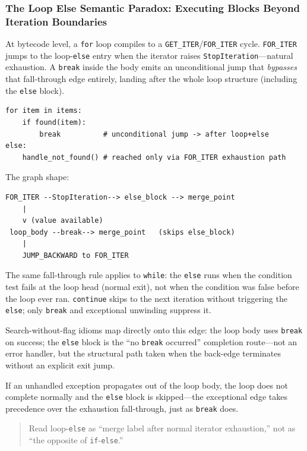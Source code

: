 \documentclass[a4paper,twoside]{report}
\begin{document}
\subsubsection{The Loop Else Semantic Paradox: Executing Blocks Beyond Iteration Boundaries}

At bytecode level, a \texttt{for} loop compiles to a \texttt{GET\_ITER}/\texttt{FOR\_ITER} cycle. \texttt{FOR\_ITER} jumps to the loop-\texttt{else} entry when the iterator raises \texttt{StopIteration}---natural exhaustion. A \texttt{break} inside the body emits an unconditional jump that \emph{bypasses} that fall-through edge entirely, landing after the whole loop structure (including the \texttt{else} block).

\begin{verbatim}
for item in items:
    if found(item):
        break          # unconditional jump -> after loop+else
else:
    handle_not_found() # reached only via FOR_ITER exhaustion path
\end{verbatim}

The graph shape:

\begin{verbatim}
FOR_ITER --StopIteration--> else_block --> merge_point
    |
    v (value available)
 loop_body --break--> merge_point   (skips else_block)
    |
    JUMP_BACKWARD to FOR_ITER
\end{verbatim}

The same fall-through rule applies to \texttt{while}: the \texttt{else} runs when the condition test fails at the loop head (normal exit), not when the condition was false before the loop ever ran. \texttt{continue} skips to the next iteration without triggering the \texttt{else}; only \texttt{break} and exceptional unwinding suppress it.

Search-without-flag idioms map directly onto this edge: the loop body uses \texttt{break} on success; the \texttt{else} block is the ``no \texttt{break} occurred'' completion route---not an error handler, but the structural path taken when the back-edge terminates without an explicit exit jump.

If an unhandled exception propagates out of the loop body, the loop does not complete normally and the \texttt{else} block is skipped---the exceptional edge takes precedence over the exhaustion fall-through, just as \texttt{break} does.

\begin{quote}
Read loop-\texttt{else} as ``merge label after normal iterator exhaustion,'' not as ``the opposite of \texttt{if}-\texttt{else}.''
\end{quote}
\end{document}
